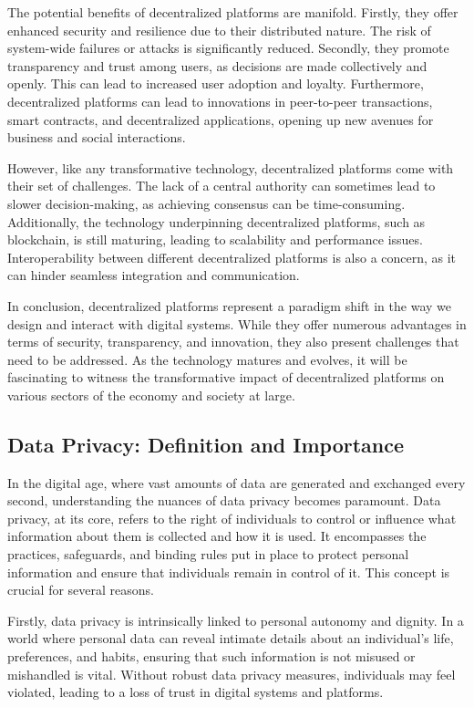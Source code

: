 The potential benefits of decentralized platforms are manifold. Firstly, they offer enhanced security and resilience due to their distributed nature. The risk of system-wide failures or attacks is significantly reduced. Secondly, they promote transparency and trust among users, as decisions are made collectively and openly. This can lead to increased user adoption and loyalty. Furthermore, decentralized platforms can lead to innovations in peer-to-peer transactions, smart contracts, and decentralized applications, opening up new avenues for business and social interactions.

However, like any transformative technology, decentralized platforms come with their set of challenges. The lack of a central authority can sometimes lead to slower decision-making, as achieving consensus can be time-consuming. Additionally, the technology underpinning decentralized platforms, such as blockchain, is still maturing, leading to scalability and performance issues. Interoperability between different decentralized platforms is also a concern, as it can hinder seamless integration and communication.

In conclusion, decentralized platforms represent a paradigm shift in the way we design and interact with digital systems. While they offer numerous advantages in terms of security, transparency, and innovation, they also present challenges that need to be addressed. As the technology matures and evolves, it will be fascinating to witness the transformative impact of decentralized platforms on various sectors of the economy and society at large.

\subsection{Data Privacy: Definition and Importance}
In the digital age, where vast amounts of data are generated and exchanged every second, understanding the nuances of data privacy becomes paramount. Data privacy, at its core, refers to the right of individuals to control or influence what information about them is collected and how it is used. It encompasses the practices, safeguards, and binding rules put in place to protect personal information and ensure that individuals remain in control of it. This concept is crucial for several reasons.

Firstly, data privacy is intrinsically linked to personal autonomy and dignity. In a world where personal data can reveal intimate details about an individual's life, preferences, and habits, ensuring that such information is not misused or mishandled is vital. Without robust data privacy measures, individuals may feel violated, leading to a loss of trust in digital systems and platforms.

